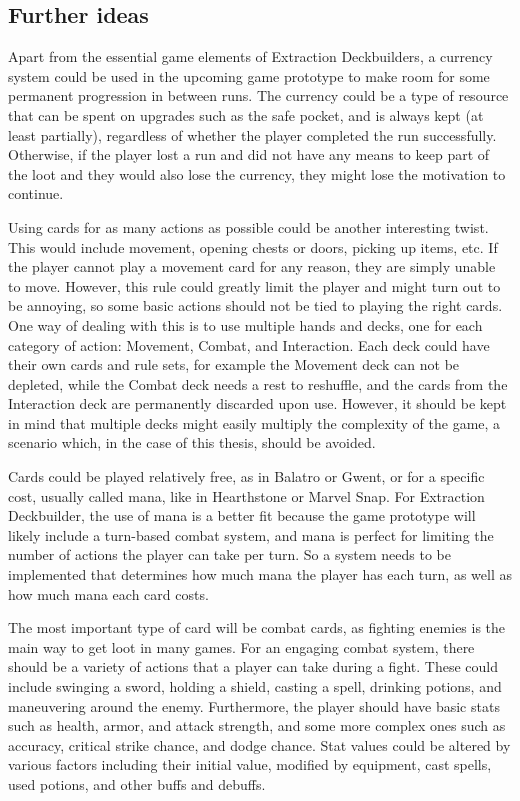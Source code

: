 \subsection{Further ideas}

Apart from the essential game elements of Extraction Deckbuilders, a currency system could be used in the upcoming game prototype to make room for some permanent progression in between runs. The currency could be a type of resource that can be spent on upgrades such as the safe pocket, and is always kept (at least partially), regardless of whether the player completed the run successfully. Otherwise, if the player lost a run and did not have any means to keep part of the loot and they would also lose the currency, they might lose the motivation to continue.

Using cards for as many actions as possible could be another interesting twist. This would include movement, opening chests or doors, picking up items, etc. If the player cannot play a movement card for any reason, they are simply unable to move. However, this rule could greatly limit the player and might turn out to be annoying, so some basic actions should not be tied to playing the right cards. One way of dealing with this is to use multiple hands and decks, one for each category of action: Movement, Combat, and Interaction. Each deck could have their own cards and rule sets, for example the Movement deck can not be depleted, while the Combat deck needs a rest to reshuffle, and the cards from the Interaction deck are permanently discarded upon use. However, it should be kept in mind that multiple decks might easily multiply the complexity of the game, a scenario which, in the case of this thesis, should be avoided.

Cards could be played relatively free, as in Balatro\cite{balatro2024} or Gwent\cite{gwent2018}, or for a specific cost, usually called mana, like in Hearthstone\cite{hearthstone2014} or Marvel Snap\cite{marvelSnap2022}. For Extraction Deckbuilder, the use of mana is a better fit because the game prototype will likely include a turn-based combat system, and mana is perfect for limiting the number of actions the player can take per turn. So a system needs to be implemented that determines how much mana the player has each turn, as well as how much mana each card costs.

The most important type of card will be combat cards, as fighting enemies is the main way to get loot in many games. For an engaging combat system, there should be a variety of actions that a player can take during a fight. These could include swinging a sword, holding a shield, casting a spell, drinking potions, and maneuvering around the enemy. Furthermore, the player should have basic stats such as health, armor, and attack strength, and some more complex ones such as accuracy, critical strike chance, and dodge chance. Stat values could be altered by various factors including their initial value, modified by equipment, cast spells, used potions, and other buffs and debuffs.




